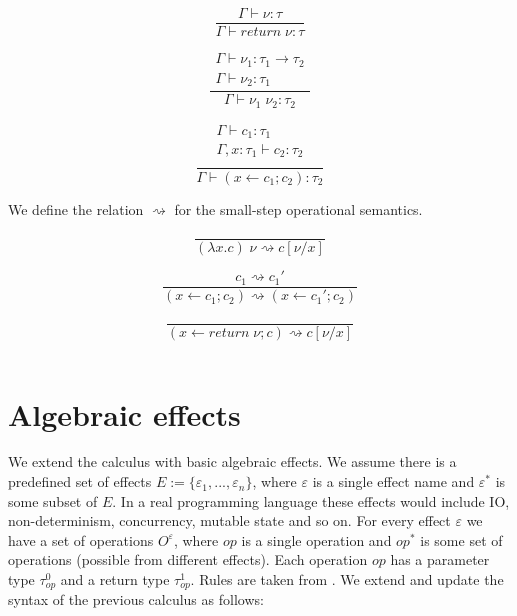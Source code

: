 \documentclass[12pt]{article}
\newcommand\eff[0]{\varepsilon}
\newcommand\steffs[0]{E}
\newcommand\effs[0]{\eff^*}
\newcommand\eop[0]{\textit{op}}
\newcommand\eopa[0]{\textit{op}^*}
\newcommand\eops[1]{O^{#1}}
\newcommand\type[0]{\tau}
\newcommand\tarr[2]{#1 \rightarrow #2}
\newcommand\val[0]{\nu}
\newcommand\vabs[2]{\lambda #1 . #2}
\newcommand\comp[0]{c}
\newcommand\creturn[1]{\textit{return} \; #1}
\newcommand\capp[2]{#1 \; #2}
\newcommand\cdo[3]{#1 \leftarrow #2 ; #3}
\begin{document}
\vspace{10pt}
\begin{minipage}{0.33\textwidth}
\[\frac{
	\begin{array}{l}
	\Gamma \vdash \val : \type
	\end{array}
}{
	\Gamma \vdash \creturn{\val} : \type
}\]
\end{minipage}
\begin{minipage}{0.33\textwidth}
\[\frac{
	\begin{array}{l}
	\Gamma \vdash \val_1 : \tarr{\type_1}{\type_2} \\
	\Gamma \vdash \val_2 : \type_1
	\end{array}
}{
	\Gamma \vdash \capp{\val_1}{\val_2} : \type_2
}\]
\end{minipage}
\begin{minipage}{0.33\textwidth}
\[\frac{
	\begin{array}{l}
	\Gamma \vdash \comp_1 : \type_1 \\
	\Gamma , x : \type_1 \vdash \comp_2 : \type_2 \\
	\end{array}
}{
	\Gamma \vdash (\cdo{x}{\comp_1}{\comp_2}) : \type_2
}\]
\end{minipage}

We define the relation $\rightsquigarrow$ for the small-step operational semantics. \\
\begin{minipage}{0.5\textwidth}
\[\frac{
}{
	\capp{(\vabs{x}{\comp})}{\val} \rightsquigarrow \comp[\val / x]
}\]
\end{minipage}
\begin{minipage}{0.5\textwidth}
\[\frac{
	\comp_1 \rightsquigarrow \comp_1'
}{
	(\cdo{x}{\comp_1}{\comp_2}) \rightsquigarrow (\cdo{x}{\comp_1'}{\comp_2})
}\]
\end{minipage}
\[\frac{
}{
	(\cdo{x}{\creturn{\val}}{\comp}) \rightsquigarrow \comp[\val / x]
}\]

\inputminted{haskell}{code1.txt}

\newpage
\section{Algebraic effects}
We extend the calculus with basic algebraic effects. 
We assume there is a predefined set of effects $\steffs := \{ \eff_1, ..., \eff_n \}$, where $\eff$ is a single effect name and $\effs$ is some subset of $\steffs$.
In a real programming language these effects would include IO, non-determinism, concurrency, mutable state and so on.
For every effect $\eff$ we have a set of operations $\eops{\eff}$, where $\eop$ is a single operation and $\eopa$ is some set of operations (possible from different effects). Each operation $\eop$ has a parameter type $\type^0_\eop$ and a return type $\type^1_\eop$. Rules are taken from \cite{pretnar}.
We extend and update the syntax of the previous calculus as follows:
\end{document}
